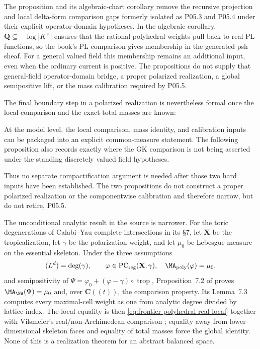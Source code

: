 The proposition and its algebraic-chart corollary remove the recursive
projection and local delta-form comparison gaps formerly isolated as
P05.3 and P05.4 under their explicit operator-domain hypotheses.  In the
algebraic corollary, \(\mathbf Q\subseteq-\log|K^\times|\) ensures that
the rational polyhedral weights pull back to real PL functions, so the
book's PL comparison gives membership in the generated psh sheaf.  For
a general valued field this membership remains an additional input,
even when the ordinary current is positive.  The propositions do not
supply that general-field operator-domain bridge, a proper polarized
realization, a global semipositive lift, or the mass calibration required
by P05.5.

The final boundary step in a polarized realization is nevertheless formal
once the local comparison and the exact total masses are known:



At the model level, the local comparison, mass identity, and calibration
inputs can be packaged into an explicit common-measure statement.  The
following proposition also records exactly where the GK comparison is not
being asserted under the standing discretely valued field hypotheses.



Thus no separate compactification argument is needed after those two hard
inputs have been established.  The two propositions do not construct a
proper polarized realization or the componentwise calibration and therefore
narrow, but do not retire, P05.5.

The unconditional analytic result in the source is narrower.  For the
toric degenerations of Calabi--Yau complete intersections in its
\S7, let \(\mathbf X\) be the tropicalization, let
\(\gamma\) be the polarization weight, and let \(\mu_0\) be Lebesgue
measure on the essential skeleton.  Under the three assumptions
\[
 (L^d)=\deg(\gamma),\qquad
 \varphi\in\mathrm{PC}_{\mathrm{reg}}(\mathbf X,\gamma),
 \quad\MA_{\mathrm{poly}}(\varphi)=\mu_0,
\]
and semipositivity of
\(
 \Psi=\varphi_0+(\varphi-\gamma)\circ\operatorname{trop}
\), Proposition~7.2 of \cite{BMPS26} proves
\(
 \MA_{\NA}(\Psi)=\mu_0
\)
and, over \(\mathbf C((t))\), the comparison property.  Its Lemma~7.3
computes every maximal-cell weight as one from analytic degree divided by
lattice index.  The local equality is then
\eqref{eq:frontier-polyhedral-real-local} together with Vilsmeier's
real/non-Archimedean comparison \cite[Theorem~1.1]{Vil20}; equality away
from lower-dimensional skeleton faces and equality of total masses force
the global identity.  None of this is a realization theorem for an abstract
balanced space.

